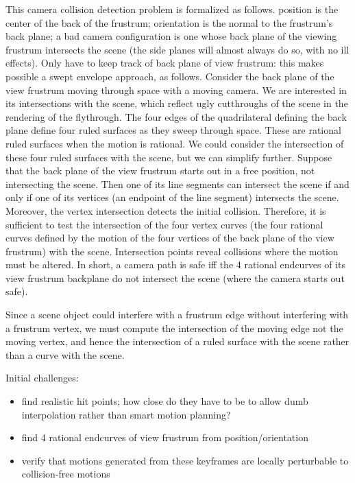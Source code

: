 \documentclass[12pt]{article}
\begin{document}
This camera collision detection problem is formalized as follows.
       position is the center of the back of the frustrum;
       orientation is the normal to the frustrum's back plane;
       a bad camera configuration is one whose back plane of the viewing frustrum 
       intersects the scene (the side planes will almost always do so, with no
       ill effects).
       Only have to keep track of back plane of view frustrum: this makes possible
       a swept envelope approach, as follows.
Consider the back plane of the view frustrum moving through space with a moving camera.
We are interested in its intersections with the scene, which reflect ugly cutthroughs
of the scene in the rendering of the flythrough.
The four edges of the quadrilateral defining the back plane define four ruled surfaces
as they sweep through space.
These are rational ruled surfaces when the motion is rational.
We could consider the intersection of these four ruled surfaces with the scene,
but we can simplify further.
Suppose that the back plane of the view frustrum starts out in a free position,
not intersecting the scene.
Then one of its line segments can intersect the scene if and only if one of its vertices
(an endpoint of the line segment) intersects the scene.
Moreover, the vertex intersection detects the initial collision.
Therefore, it is sufficient to test the intersection of the four vertex curves
(the four rational curves defined by the motion of the four vertices of the back plane
of the view frustrum) with the scene.
Intersection points reveal collisions where the motion must be altered.
In short, a camera path is safe iff the 4 rational endcurves of its view frustrum
backplane do not intersect the scene (where the camera starts out safe).

Since a scene object could interfere with a frustrum edge without
interfering with a frustrum vertex, we must compute the intersection of the moving edge
not the moving vertex, and hence the intersection of a ruled surface with the scene
rather than a curve with the scene.

Initial challenges:
\begin{itemize}
\item find realistic hit points;
      how close do they have to be to allow dumb interpolation rather than
      smart motion planning?
\item find 4 rational endcurves of view frustrum from position/orientation 
\item verify that motions generated from these keyframes are locally perturbable
      to collision-free motions
\end{itemize}
\end{document}
